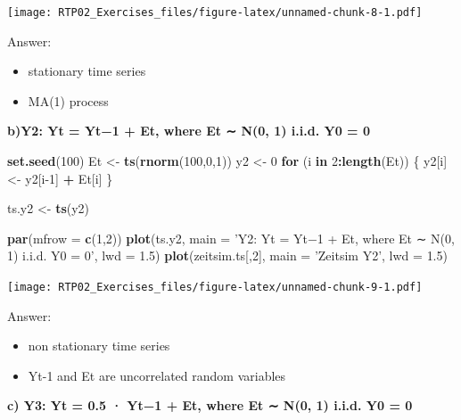 \documentclass[
]{article}
\newenvironment{Shaded}{\begin{snugshade}}{\end{snugshade}}
\newcommand{\ControlFlowTok}[1]{\textcolor[rgb]{0.13,0.29,0.53}{\textbf{#1}}}
\newcommand{\DataTypeTok}[1]{\textcolor[rgb]{0.13,0.29,0.53}{#1}}
\newcommand{\DecValTok}[1]{\textcolor[rgb]{0.00,0.00,0.81}{#1}}
\newcommand{\FloatTok}[1]{\textcolor[rgb]{0.00,0.00,0.81}{#1}}
\newcommand{\KeywordTok}[1]{\textcolor[rgb]{0.13,0.29,0.53}{\textbf{#1}}}
\newcommand{\NormalTok}[1]{#1}
\newcommand{\OperatorTok}[1]{\textcolor[rgb]{0.81,0.36,0.00}{\textbf{#1}}}
\newcommand{\StringTok}[1]{\textcolor[rgb]{0.31,0.60,0.02}{#1}}
\begin{document}
\texttt{[image: RTP02\_Exercises\_files/figure-latex/unnamed-chunk-8-1.pdf]}

Answer:

\begin{itemize}
\item
  stationary time series
\item
  MA(1) process
\end{itemize}

\textbf{b)Y2: Yt = Yt−1 + Et, where Et ∼ N(0, 1) i.i.d. Y0 = 0}

\begin{Shaded}
\begin{Highlighting}[]
\KeywordTok{set.seed}\NormalTok{(}\DecValTok{100}\NormalTok{)}
\NormalTok{Et <-}\StringTok{ }\KeywordTok{ts}\NormalTok{(}\KeywordTok{rnorm}\NormalTok{(}\DecValTok{100}\NormalTok{,}\DecValTok{0}\NormalTok{,}\DecValTok{1}\NormalTok{))}
\NormalTok{y2 <-}\StringTok{ }\DecValTok{0}
\ControlFlowTok{for}\NormalTok{ (i }\ControlFlowTok{in} \DecValTok{2}\OperatorTok{:}\KeywordTok{length}\NormalTok{(Et)) \{}
\NormalTok{  y2[i] <-}\StringTok{ }\NormalTok{y2[i}\DecValTok{-1}\NormalTok{] }\OperatorTok{+}\StringTok{ }\NormalTok{Et[i]}
\NormalTok{\}}

\NormalTok{ts.y2 <-}\StringTok{ }\KeywordTok{ts}\NormalTok{(y2)}

\KeywordTok{par}\NormalTok{(}\DataTypeTok{mfrow =} \KeywordTok{c}\NormalTok{(}\DecValTok{1}\NormalTok{,}\DecValTok{2}\NormalTok{))}
\KeywordTok{plot}\NormalTok{(ts.y2, }\DataTypeTok{main =} \StringTok{'Y2: Yt = Yt−1 + Et, where Et ∼ N(0, 1) i.i.d. Y0 = 0'}\NormalTok{, }\DataTypeTok{lwd =} \FloatTok{1.5}\NormalTok{)}
\KeywordTok{plot}\NormalTok{(zeitsim.ts[,}\DecValTok{2}\NormalTok{], }\DataTypeTok{main =} \StringTok{'Zeitsim Y2'}\NormalTok{, }\DataTypeTok{lwd =} \FloatTok{1.5}\NormalTok{)}
\end{Highlighting}
\end{Shaded}

\texttt{[image: RTP02\_Exercises\_files/figure-latex/unnamed-chunk-9-1.pdf]}

Answer:

\begin{itemize}
\item
  non stationary time series
\item
  Yt-1 and Et are uncorrelated random variables
\end{itemize}

\textbf{c) Y3: Yt = 0.5 · Yt−1 + Et, where Et ∼ N(0, 1) i.i.d. Y0 = 0}
\end{document}
